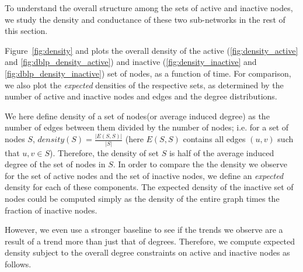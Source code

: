 \documentclass[phd,tocprelim]{cornell}
\renewcommand{\caption}[1]{\singlespacing\hangcaption{#1}\normalspacing}
\begin{document}




To understand the overall structure among the sets of active and inactive nodes, we study the density and conductance of these two sub-networks in the rest of this section.

Figure~\ref{fig:density} and plots the overall density of the active (\ref{fig:density_active} and \ref{fig:dblp_density_active}) and inactive (\ref{fig:density_inactive} and \ref{fig:dblp_density_inactive}) set of nodes, as a function of time. For comparison, we also plot the {\em expected} densities of the respective sets, as determined by the number of active and inactive nodes and edges and the degree distributions. 

We here define density of a set of nodes(or average induced degree) as the number of edges between them divided by the number of nodes; i.e. for a set of nodes $S$, $density(S) = \frac{|E(S, S)|}{|S|}$ (here $E(S, S)$ contains all edges $(u, v)$ such that $u, v\in S$). Therefore, the density of set $S$ is half of the average induced degree of the set of nodes in $S$. In order to compare the the density we observe for the set of active nodes and the set of inactive nodes, we define an {\em expected} density for each of these components. The expected density of the inactive set of nodes could be computed simply as the density of the entire graph times the fraction of inactive nodes. 

However, we even use a stronger baseline to see if the trends we observe are a result of a trend more than just that of degrees. Therefore, we compute expected density subject to the overall degree constraints on active and inactive nodes as follows. 
\end{document}
